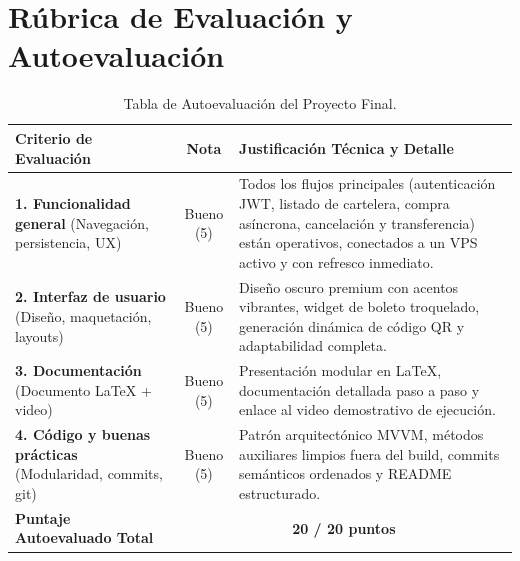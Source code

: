 \section{Rúbrica de Evaluación y Autoevaluación}

\begin{table}[h!]
\centering
\small
\renewcommand{\arraystretch}{1.3}
\begin{tabular}{|p{4.5cm}|c|p{7cm}|}
\hline
\textbf{Criterio de Evaluación} & \textbf{Nota} & \textbf{Justificación Técnica y Detalle} \\ \hline
\textbf{1. Funcionalidad general} \newline (Navegación, persistencia, UX) & Bueno (5) & Todos los flujos principales (autenticación JWT, listado de cartelera, compra asíncrona, cancelación y transferencia) están operativos, conectados a un VPS activo y con refresco inmediato. \\ \hline
\textbf{2. Interfaz de usuario} \newline (Diseño, maquetación, layouts) & Bueno (5) & Diseño oscuro premium con acentos vibrantes, widget de boleto troquelado, generación dinámica de código QR y adaptabilidad completa. \\ \hline
\textbf{3. Documentación} \newline (Documento LaTeX + video) & Bueno (5) & Presentación modular en LaTeX, documentación detallada paso a paso y enlace al video demostrativo de ejecución. \\ \hline
\textbf{4. Código y buenas prácticas} \newline (Modularidad, commits, git) & Bueno (5) & Patrón arquitectónico MVVM, métodos auxiliares limpios fuera del build, commits semánticos ordenados y README estructurado. \\ \hline
\textbf{Puntaje Autoevaluado Total} & \multicolumn{2}{c|}{\textbf{20 / 20 puntos}} \\ \hline
\end{tabular}
\caption{Tabla de Autoevaluación del Proyecto Final.}
\label{tab:rubrica}
\end{table}
